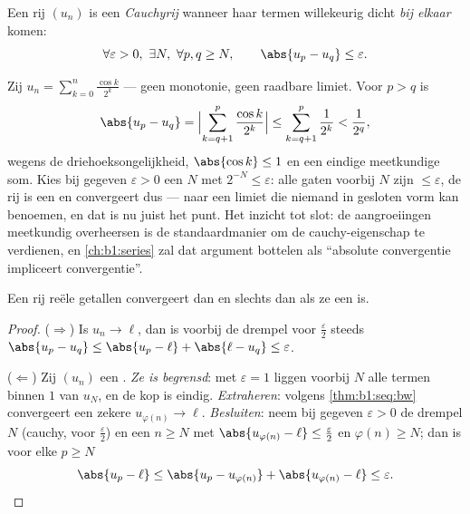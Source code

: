 \begin{definition}\label{def:b1:seq:cauchy}
Een rij $(u_n)$ is een \emph{Cauchyrij} wanneer haar
termen willekeurig dicht \emph{bij elkaar} komen:
\[
\forall \varepsilon > 0,\ \exists N,\ \forall p, q \geq N,
\qquad \abs{u_p - u_q} \leq \varepsilon .
\]
\end{definition}

\begin{example}\label{ex:b1:seq:cauchyhand}
Zij $u_n = \sum_{k=0}^{n} \frac{\cos k}{2^k}$ --- geen monotonie, geen
raadbare limiet. Voor $p > q$ is
\[
\abs{u_p - u_q}
= \Bigl| \sum_{k=q+1}^{p} \frac{\cos k}{2^k} \Bigr|
\leq \sum_{k=q+1}^{p} \frac{1}{2^k}
< \frac{1}{2^{q}} ,
\]
wegens de driehoeksongelijkheid, $\abs{\cos k} \leq 1$ en een eindige
meetkundige som. Kies bij gegeven $\varepsilon > 0$ een $N$ met $2^{-N}
\leq \varepsilon$: alle gaten voorbij $N$ zijn $\leq \varepsilon$, de rij
is een  en convergeert dus --- naar een limiet die niemand in
gesloten vorm kan benoemen, en dat is nu juist het punt. Het inzicht tot
slot: de aangroeiingen meetkundig overheersen is de standaardmanier om de
cauchy-eigenschap te verdienen, en \cref{ch:b1:series} zal dat argument
bottelen als ``absolute convergentie impliceert convergentie''.
\end{example}

\begin{theorem}\label{thm:b1:seq:complete}
Een rij reële getallen convergeert dan en slechts dan als ze een
 is.
\end{theorem}

\begin{proof}
($\Rightarrow$) Is $u_n \to \ell$, dan is voorbij de drempel voor
$\frac\varepsilon2$ steeds $\abs{u_p - u_q} \leq \abs{u_p - \ell} +
\abs{\ell - u_q} \leq \varepsilon$.

($\Leftarrow$) Zij $(u_n)$ een . \emph{Ze is begrensd}: met
$\varepsilon = 1$ liggen voorbij $N$ alle termen binnen $1$ van $u_N$, en
de kop is eindig. \emph{Extraheren}: volgens
\cref{thm:b1:seq:bw} convergeert een zekere  $u_{\varphi(n)} \to
\ell$. \emph{Besluiten}: neem bij gegeven $\varepsilon > 0$ de drempel
$N$ (cauchy, voor $\frac\varepsilon2$) en een $n \geq N$ met
$\abs{u_{\varphi(n)} - \ell} \leq \frac\varepsilon2$ en $\varphi(n) \geq
N$; dan is voor elke $p \geq N$
\[
\abs{u_p - \ell} \leq \abs{u_p - u_{\varphi(n)}} +
\abs{u_{\varphi(n)} - \ell} \leq \varepsilon . \qedhere
\]
\end{proof}

